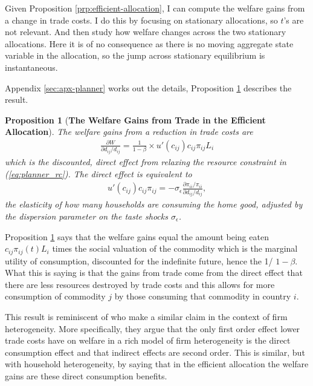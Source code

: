 \documentclass[12pt,pdftex]{article}
\newtheorem{prp}{Proposition}
\begin{document}
\begin{onehalfspacing}
Given Proposition \ref{prp:efficient-allocation}, I can compute the welfare gains from a change in trade costs. I do this by focusing on stationary allocations, so $t$'s are not relevant. And then study how welfare changes across the two stationary allocations. Here it is of no consequence as there is no moving aggregate state variable in the allocation, so the jump across stationary equilibrium is instantaneous.

Appendix \ref{sec:apx-planner} works out the details, Proposition \ref{prp:gains-efficient-allocation} describes the result.

\begin{prp}[\textbf{The Welfare Gains from Trade in the Efficient Allocation}]\label{prp:gains-efficient-allocation} The welfare gains from a reduction in trade costs are
\begin{align}
\frac{\partial W}{\partial d_{ij} / d_{ij}} = \frac{1}{1-\beta} \times u'(c_{ij}) c_{ij} \pi_{ij} L_i
\nonumber
\end{align}
which is the discounted, direct effect from relaxing the resource constraint in (\ref{eq:planner_rc}). The direct effect is equivalent to
\begin{align}
u'(c_{ij})c_{ij}\pi_{ij} = -\sigma_{\epsilon}\frac{\partial \pi_{ii} / \pi_{ii}}{\partial d_{ij} / d_{ij}},
\end{align}
the elasticity of how many households are consuming the home good, adjusted by the dispersion parameter on the taste shocks $\sigma_{\epsilon}$.
\end{prp}

Proposition \ref{prp:gains-efficient-allocation} says that the welfare gains equal the amount being eaten $c_{ij} \pi_{ij}(t) L_i$ times the social valuation of the commodity which is the marginal utility of consumption, discounted for the indefinite future, hence the 1/ $1-\beta$. What this is saying is that the gains from trade come from the direct effect that there are less resources destroyed by trade costs and this allows for more consumption of commodity $j$ by those consuming that commodity in country $i$. 

This result is reminiscent of \citet{AtkesonBurstein2010} who make a similar claim in the context of firm heterogeneity. More specifically, they argue that the only
first order effect lower trade costs have on welfare in a rich model of firm heterogeneity is the direct consumption effect and that indirect effects are second order. This is similar, but with household heterogeneity, by saying that in the efficient allocation the welfare gains are these direct consumption benefits.


\end{onehalfspacing}
\end{document}
